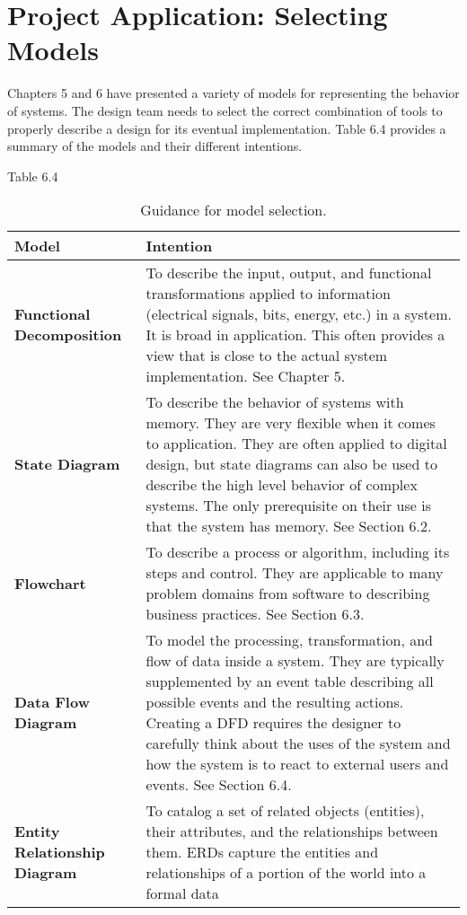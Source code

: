 \section{Project Application: Selecting Models}
\label{section:project-application-selecting-models}

Chapters 5 and 6 have presented a variety of models for representing the
behavior of systems. The design team needs to select the correct
combination of tools to properly describe a design for its eventual
implementation. Table 6.4 provides a summary of the models and their
different intentions.

Table 6.4

\begin{table}
\caption{Guidance for model selection.}
\label{table:<context>}
\begin{tabular}{|l|m{10cm}|}
\hline
\textbf{Model} & \textbf{Intention} \\ \hline
\textbf{Functional Decomposition} & To describe the input, output, and
functional transformations applied to information (electrical signals,
bits, energy, etc.) in a system. It is broad in application. This often
provides a view that is close to the actual system implementation. See
Chapter 5. \\ \hline
\textbf{State Diagram} & To describe the behavior of systems with
memory. They are very flexible when it comes to application. They are
often applied to digital design, but state diagrams can also be used to
describe the high level behavior of complex systems. The only
prerequisite on their use is that the system has memory. See Section
6.2. \\ \hline
\textbf{Flowchart} & To describe a process or algorithm, including its
steps and control. They are applicable to many problem domains from
software to describing business practices. See Section 6.3. \\ \hline
\textbf{Data Flow Diagram} & To model the processing, transformation, and flow of
data inside a system. They are typically supplemented by an event table
describing all possible events and the resulting actions. Creating a DFD
requires the designer to carefully think about the uses of the system
and how the system is to react to external users and events. See Section
6.4. \\  \hline
\textbf{Entity Relationship Diagram} & To catalog a set of related objects (entities), their
attributes, and the relationships between them. ERDs capture the
entities and relationships of a portion of the world into a formal data

\end{tabular}
\end{table}
